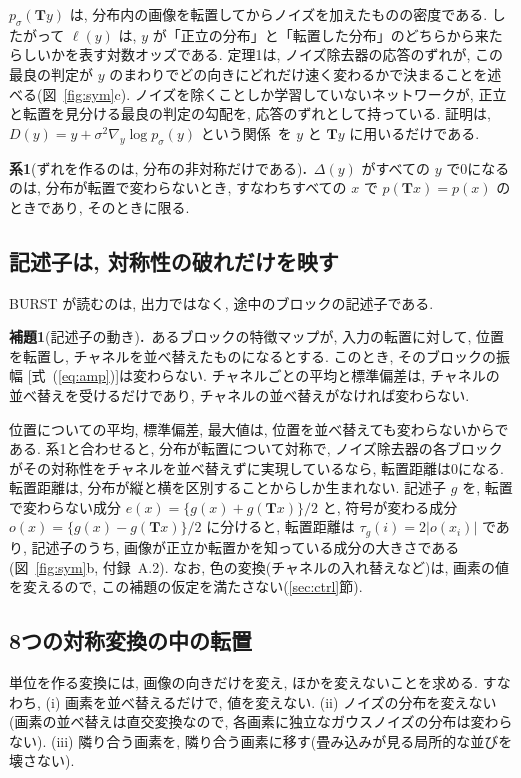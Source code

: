 \documentclass[MIRU,submit]{miru2025j}
\newcommand{\Tm}{\mathbf{T}}            %
\newcommand{\thm}[2]{\par\vspace{0.6mm}\noindent\textbf{#1}#2\textbf{.}\ }             %
\newcommand{\method}{BURST}                 %
\renewcommand{\eqref}[1]{(\ref{#1})}
\begin{document}
$p_\sigma(\Tm y)$ は, 分布内の画像を転置してからノイズを加えたものの密度である. したがって $\ell(y)$ は, $y$ が「正立の分布」と「転置した分布」のどちらから来たらしいかを表す対数オッズである. 定理1は, ノイズ除去器の応答のずれが, この最良の判定が $y$ のまわりでどの向きにどれだけ速く変わるかで決まることを述べる(図~\ref{fig:sym}c). ノイズを除くことしか学習していないネットワークが, 正立と転置を見分ける最良の判定の勾配を, 応答のずれとして持っている. 証明は, $D(y)=y+\sigma^{2}\nabla_y\log p_\sigma(y)$ という関係~\cite{efron2011tweedie,vincent2011dsm}を $y$ と $\Tm y$ に用いるだけである.

\thm{系1}{(ずれを作るのは, 分布の非対称だけである)}$\Delta(y)$ がすべての $y$ で0になるのは, 分布が転置で変わらないとき, すなわちすべての $x$ で $p(\Tm x)=p(x)$ のときであり, そのときに限る.\par\vspace{0.6mm}

\subsection{記述子は, 対称性の破れだけを映す}
\label{sec:evenodd}
\method{} が読むのは, 出力ではなく, 途中のブロックの記述子である.

\thm{補題1}{(記述子の動き)}あるブロックの特徴マップが, 入力の転置に対して, 位置を転置し, チャネルを並べ替えたものになるとする. このとき, そのブロックの振幅 [式~\eqref{eq:amp}]は変わらない. チャネルごとの平均と標準偏差は, チャネルの並べ替えを受けるだけであり, チャネルの並べ替えがなければ変わらない.\par\vspace{0.6mm}

位置についての平均, 標準偏差, 最大値は, 位置を並べ替えても変わらないからである. 系1と合わせると, 分布が転置について対称で, ノイズ除去器の各ブロックがその対称性をチャネルを並べ替えずに実現しているなら, 転置距離は0になる. 転置距離は, 分布が縦と横を区別することからしか生まれない. 記述子 $g$ を, 転置で変わらない成分 $e(x)=\{g(x)+g(\Tm x)\}/2$ と, 符号が変わる成分 $o(x)=\{g(x)-g(\Tm x)\}/2$ に分けると, 転置距離は $\tau_g(i)=2|o(x_i)|$ であり, 記述子のうち, 画像が正立か転置かを知っている成分の大きさである(図~\ref{fig:sym}b, 付録~A.2). なお, 色の変換(チャネルの入れ替えなど)は, 画素の値を変えるので, この補題の仮定を満たさない(\ref{sec:ctrl}節).

\subsection{8つの対称変換の中の転置}
\label{sec:which}
単位を作る変換には, 画像の向きだけを変え, ほかを変えないことを求める. すなわち, (i) 画素を並べ替えるだけで, 値を変えない. (ii) ノイズの分布を変えない(画素の並べ替えは直交変換なので, 各画素に独立なガウスノイズの分布は変わらない). (iii) 隣り合う画素を, 隣り合う画素に移す(畳み込みが見る局所的な並びを壊さない).
\end{document}
